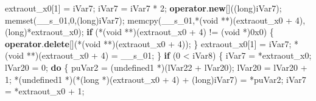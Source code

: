 \documentclass[
]{article}
\newenvironment{Shaded}{}{}
\newcommand{\BaseNTok}[1]{\textcolor[rgb]{0.25,0.63,0.44}{#1}}
\newcommand{\ControlFlowTok}[1]{\textcolor[rgb]{0.00,0.44,0.13}{\textbf{#1}}}
\newcommand{\DataTypeTok}[1]{\textcolor[rgb]{0.56,0.13,0.00}{#1}}
\newcommand{\DecValTok}[1]{\textcolor[rgb]{0.25,0.63,0.44}{#1}}
\newcommand{\KeywordTok}[1]{\textcolor[rgb]{0.00,0.44,0.13}{\textbf{#1}}}
\newcommand{\NormalTok}[1]{#1}
\newcommand{\OperatorTok}[1]{\textcolor[rgb]{0.40,0.40,0.40}{#1}}
\begin{document}
\begin{Shaded}
\begin{Highlighting}[]
\NormalTok{      extraout\_x0}\OperatorTok{[}\DecValTok{1}\OperatorTok{]} \OperatorTok{=}\NormalTok{ iVar7}\OperatorTok{;}
\NormalTok{      iVar7 }\OperatorTok{=}\NormalTok{ iVar7 }\OperatorTok{*} \DecValTok{2}\OperatorTok{;}
      \KeywordTok{operator}\OperatorTok{.}\KeywordTok{new}\OperatorTok{[]((}\DataTypeTok{long}\OperatorTok{)}\NormalTok{iVar7}\OperatorTok{);}
\NormalTok{      memset}\OperatorTok{(}\NormalTok{\_\_s\_01}\OperatorTok{,}\DecValTok{0}\OperatorTok{,(}\DataTypeTok{long}\OperatorTok{)}\NormalTok{iVar7}\OperatorTok{);}
\NormalTok{      memcpy}\OperatorTok{(}\NormalTok{\_\_s\_01}\OperatorTok{,*(}\DataTypeTok{void} \OperatorTok{**)(}\NormalTok{extraout\_x0 }\OperatorTok{+} \DecValTok{4}\OperatorTok{),(}\DataTypeTok{long}\OperatorTok{)*}\NormalTok{extraout\_x0}\OperatorTok{);}
      \ControlFlowTok{if} \OperatorTok{(*(}\DataTypeTok{void} \OperatorTok{**)(}\NormalTok{extraout\_x0 }\OperatorTok{+} \DecValTok{4}\OperatorTok{)} \OperatorTok{!=} \OperatorTok{(}\DataTypeTok{void} \OperatorTok{*)}\BaseNTok{0x0}\OperatorTok{)} \OperatorTok{\{}
        \KeywordTok{operator}\OperatorTok{.}\KeywordTok{delete}\OperatorTok{[](*(}\DataTypeTok{void} \OperatorTok{**)(}\NormalTok{extraout\_x0 }\OperatorTok{+} \DecValTok{4}\OperatorTok{));}
      \OperatorTok{\}}
\NormalTok{      extraout\_x0}\OperatorTok{[}\DecValTok{1}\OperatorTok{]} \OperatorTok{=}\NormalTok{ iVar7}\OperatorTok{;}
      \OperatorTok{*(}\DataTypeTok{void} \OperatorTok{**)(}\NormalTok{extraout\_x0 }\OperatorTok{+} \DecValTok{4}\OperatorTok{)} \OperatorTok{=}\NormalTok{ \_\_s\_01}\OperatorTok{;}
    \OperatorTok{\}}
    \ControlFlowTok{if} \OperatorTok{(}\DecValTok{0} \OperatorTok{\textless{}}\NormalTok{ iVar8}\OperatorTok{)} \OperatorTok{\{}
\NormalTok{      iVar7 }\OperatorTok{=} \OperatorTok{*}\NormalTok{extraout\_x0}\OperatorTok{;}
\NormalTok{      lVar20 }\OperatorTok{=} \DecValTok{0}\OperatorTok{;}
      \ControlFlowTok{do} \OperatorTok{\{}
\NormalTok{        puVar2 }\OperatorTok{=} \OperatorTok{(}\NormalTok{undefined1 }\OperatorTok{*)(}\NormalTok{lVar22 }\OperatorTok{+}\NormalTok{ lVar20}\OperatorTok{);}
\NormalTok{        lVar20 }\OperatorTok{=}\NormalTok{ lVar20 }\OperatorTok{+} \DecValTok{1}\OperatorTok{;}
        \OperatorTok{*(}\NormalTok{undefined1 }\OperatorTok{*)(*(}\DataTypeTok{long} \OperatorTok{*)(}\NormalTok{extraout\_x0 }\OperatorTok{+} \DecValTok{4}\OperatorTok{)} \OperatorTok{+} \OperatorTok{(}\DataTypeTok{long}\OperatorTok{)}\NormalTok{iVar7}\OperatorTok{)} \OperatorTok{=} \OperatorTok{*}\NormalTok{puVar2}\OperatorTok{;}
\NormalTok{        iVar7 }\OperatorTok{=} \OperatorTok{*}\NormalTok{extraout\_x0 }\OperatorTok{+} \DecValTok{1}\OperatorTok{;}

\end{Highlighting}
\end{Shaded}
\end{document}
